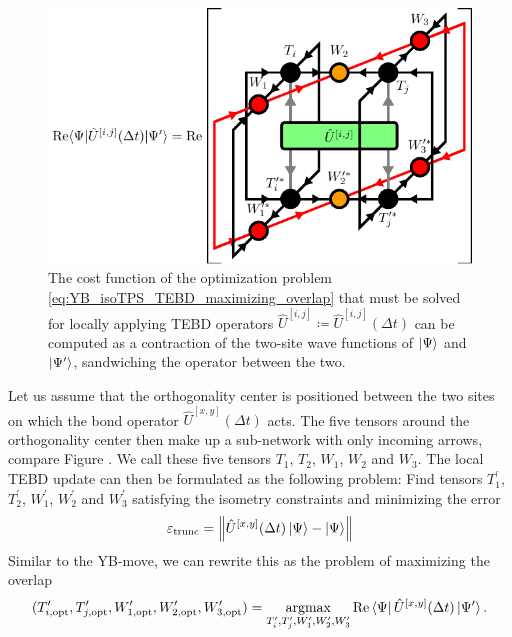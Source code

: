 \begin{figure}
	\centering
	\includegraphics[scale=1]{figures/tikz/YB_isoTPS/tebd_environment/tebd_environment.pdf}
	\caption{The cost function of the optimization problem \eqref{eq:YB_isoTPS_TEBD_maximizing_overlap} that must be solved for locally applying TEBD operators $\hat{U}^{[i,j]} \coloneqq \hat{U}^{[i,j]}(\Delta t)$ can be computed as a contraction of the two-site wave functions of $\ket{\Psi}$ and $\ket{\Psi^\prime}$, sandwiching the operator between the two.}
	\label{fig:YB_isoTPS_TEBD_overlap_contraction}
\end{figure}
Let us assume that the orthogonality center is positioned between the two sites on which the bond operator $\hat{U}^{[x, y]}\left(\Delta t\right)$ acts. The five tensors around the orthogonality center then make up a sub-network with only incoming arrows, compare Figure . We call these five tensors $T_1$, $T_2$, $W_1$, $W_2$ and $W_3$. The local TEBD update can then be formulated as the following problem: Find tensors $T_1^\prime$, $T_2^\prime$, $W_1^\prime$, $W_2^\prime$ and $W_3^\prime$ satisfying the isometry constraints and minimizing the error
\begin{equation}
	\label{eq:isoDTPS_TEBD_local_update_error}
	\varepsilon_\text{trunc} = \left\lVert \hat{U}^{[x,y]}(\Delta t)\ket{\Psi} - \ket{\Psi}\right\rVert
\end{equation}
Similar to the YB-move, we can rewrite this as the problem of maximizing the overlap
\begin{equation}
	\label{eq:YB_isoTPS_TEBD_maximizing_overlap}
	(T_{i,\text{opt}}^\prime, T_{j,\text{opt}}^\prime, W_{1,\text{opt}}^\prime, W_{2,\text{opt}}^\prime, W_{3,\text{opt}}^\prime)= \underset{T_i^\prime, T_j^\prime, W_1^\prime, W_2^\prime, W_3^\prime}{\operatorname{argmax}}\operatorname{Re}\bra{\Psi}\hat{U}^{[x,y]}(\Delta t)\ket{\Psi^\prime}.
\end{equation}
